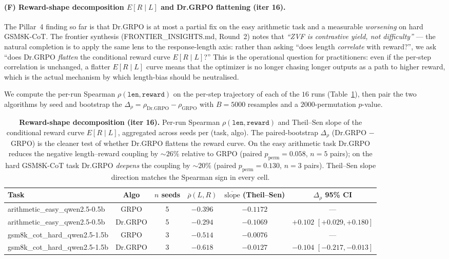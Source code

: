 \documentclass{article}
\begin{document}
\paragraph{(F) Reward-shape decomposition $E[R \mid L]$ and Dr.GRPO flattening (iter 16).}
The Pillar~4 finding so far is that Dr.GRPO is at most a partial fix on the
easy arithmetic task and a measurable \emph{worsening} on hard GSM8K-CoT.
The frontier synthesis (FRONTIER\_INSIGHTS.md, Round~2) notes that
\textit{``ZVF is contrastive yield, not difficulty''} --- the natural
completion is to apply the same lens to the response-length axis: rather
than asking ``does length \emph{correlate} with reward?'', we ask
``does Dr.GRPO \emph{flatten} the conditional reward curve $E[R \mid L]$?''
This is the operational question for practitioners: even if the
per-step correlation is unchanged, a flatter $E[R\mid L]$ curve means
that the optimizer is no longer chasing longer outputs as a path to
higher reward, which is the actual mechanism by which length-bias
should be neutralised.

We compute the per-run Spearman $\rho(\texttt{len}, \texttt{reward})$
on the per-step trajectory of each of the $16$ runs (Table~\ref{tab:reward-shape}),
then pair the two algorithms by seed and bootstrap the
$\Delta_{\rho} = \rho_{\mathrm{Dr.GRPO}} - \rho_{\mathrm{GRPO}}$ with
$B{=}5000$ resamples and a $2000$-permutation $p$-value.

\begin{table}[htbp]
\centering\small
\begin{tabular}{l c c c c c}
\hline
\textbf{Task} & \textbf{Algo} & \textbf{$n$ seeds} & \textbf{$\overline{\rho}(L,R)$} & \textbf{$\overline{\text{slope}}$ (Theil--Sen)} & \textbf{$\Delta_{\rho}$ 95\% CI}\\
\hline
arithmetic\_easy\_qwen2.5-0.5b & GRPO    & 5 & $-0.396$ & $-0.1172$ & --- \\
arithmetic\_easy\_qwen2.5-0.5b & Dr.GRPO & 5 & $-0.294$ & $-0.1069$ & $+0.102$ $[+0.029, +0.180]$ \\
gsm8k\_cot\_hard\_qwen2.5-1.5b  & GRPO    & 3 & $-0.514$ & $-0.0076$ & --- \\
gsm8k\_cot\_hard\_qwen2.5-1.5b  & Dr.GRPO & 3 & $-0.618$ & $-0.0127$ & $-0.104$ $[-0.217, -0.013]$ \\
\hline
\end{tabular}
\caption{\textbf{Reward-shape decomposition (iter 16).}
Per-run Spearman $\rho(\texttt{len},\texttt{reward})$ and Theil--Sen slope
of the conditional reward curve $E[R\mid L]$, aggregated across seeds
per (task, algo). The paired-bootstrap $\Delta_{\rho}$
(Dr.GRPO $-$ GRPO) is the cleaner test of whether Dr.GRPO flattens the
reward curve. On the easy arithmetic task Dr.GRPO reduces the negative
length--reward coupling by $\sim 26\%$ relative to GRPO (paired
$p_{\mathrm{perm}}{=}0.058$, $n{=}5$ pairs); on the hard GSM8K-CoT task
Dr.GRPO \emph{deepens} the coupling by $\sim 20\%$ (paired
$p_{\mathrm{perm}}{=}0.130$, $n{=}3$ pairs). Theil--Sen slope direction
matches the Spearman sign in every cell.}
\label{tab:reward-shape}
\end{table}
\end{document}
